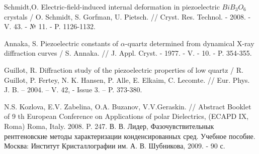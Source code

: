 \begin{thebibliography}{99}
Schmidt,O. Electric-field-induced internal deformation in piezoelectric $BiB_3O_6$ crystals /
 O. Schmidt, S. Gorfman, U. Pietsch. // Cryst. Res. Technol. - 2008. - V. 43. - № 11. - P. 1126-1132.

Annaka, S. Piezoelectric constants of $\alpha$-quartz determined from dynamical X-ray diffraction curves /
S. Annaka. // J. Appl. Cryst. - 1977. - V. - 10. - P. 354-355.

Guillot, R. Diffraction study of the piezoelectric properties of low quartz
/ R. Guillot, P. Fertey, N. K. Hansen, P. Alle, E. Elkaim, C. Lecomte. //
Eur. Phys. J. B. – 2004. – V. 42, - Issue 3. – P. 373-380.

N.S. Kozlova, E.V. Zabelina, O.A. Buzanov, V.V.Geraskin. //
Abstract Booklet of 9 th European Conference on Applications of
polar Dielectrics, (ECAPD IX, Roma) Roma, Italy. 2008. P. 247.
В. В. Лидер, Фазочувствительнык рентгеновские методы характеризации
конденсированных сред. Учебное пособие. Москва: Институт Кристаллографии им. А. В. Шубникова, 2009. - 90 с.
\end{thebibliography}
